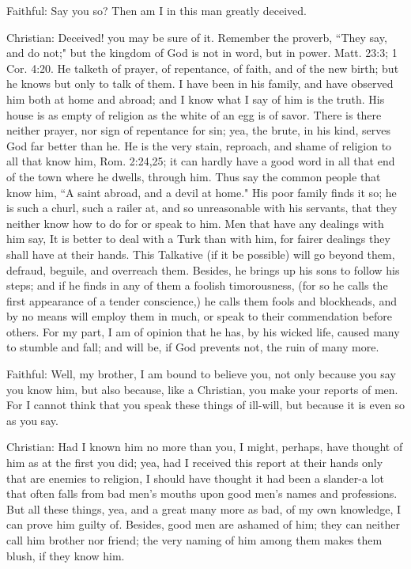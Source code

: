 Faithful: Say you so? Then am I in this man greatly deceived.

Christian: Deceived! you may be sure of it. Remember the proverb, ``They say, and do not;" but the kingdom of God is not in word, but in power. Matt. 23:3; 1 Cor. 4:20. He talketh of prayer, of repentance, of faith, and of the new birth; but he knows but only to talk of them. I have been in his family, and have observed him both at home and abroad; and I know what I say of him is the truth. His house is as empty of religion as the white of an egg is of savor. There is there neither prayer, nor sign of repentance for sin; yea, the brute, in his kind, serves God far better than he. He is the very stain, reproach, and shame of religion to all that know him, Rom. 2:24,25; it can hardly have a good word in all that end of the town where he dwells, through him. Thus say the common people that know him, ``A saint abroad, and a devil at home." His poor family finds it so; he is such a churl, such a railer at, and so unreasonable with his servants, that they neither know how to do for or speak to him. Men that have any dealings with him say, It is better to deal with a Turk than with him, for fairer dealings they shall have at their hands. This Talkative (if it be possible) will go beyond them, defraud, beguile, and overreach them. Besides, he brings up his sons to follow his steps; and if he finds in any of them a foolish timorousness, (for so he calls the first appearance of a tender conscience,) he calls them fools and blockheads, and by no means will employ them in much, or speak to their commendation before others. For my part, I am of opinion that he has, by his wicked life, caused many to stumble and fall; and will be, if God prevents not, the ruin of many more.

Faithful: Well, my brother, I am bound to believe you, not only because you say you know him, but also because, like a Christian, you make your reports of men. For I cannot think that you speak these things of ill-will, but because it is even so as you say.

Christian: Had I known him no more than you, I might, perhaps, have thought of him as at the first you did; yea, had I received this report at their hands only that are enemies to religion, I should have thought it had been a slander-a lot that often falls from bad men's mouths upon good men's names and professions. But all these things, yea, and a great many more as bad, of my own knowledge, I can prove him guilty of. Besides, good men are ashamed of him; they can neither call him brother nor friend; the very naming of him among them makes them blush, if they know him.

